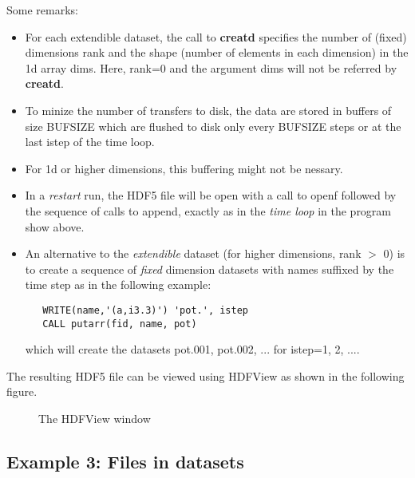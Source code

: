 \documentclass[a4paper]{article}
\begin{document}
Some remarks:
\begin{itemize}
\item  For each extendible dataset, the call to {\bfseries creatd} specifies the number
of (fixed) dimensions {\ttfamily rank} and the shape (number of elements in each
dimension) in the 1d array {\ttfamily dims}. Here, {\ttfamily rank=0} and the
argument {\ttfamily dims} will not be referred by {\bfseries creatd}.
\item  To minize the number of transfers to disk, the data are stored in
buffers of size BUFSIZE which are flushed to disk only every BUFSIZE steps or at the
last istep of the time loop.
\item  For 1d or higher dimensions, this buffering might not be nessary.
\item  In a {\itshape restart\/} run, the HDF5 file will be open with a call to
{\ttfamily openf} followed by the sequence of calls to {\ttfamily append}, exactly as
in the {\itshape time loop\/} in the program show above.
\item  An alternative to the {\itshape extendible\/} dataset (for higher
dimensions, {\ttfamily rank {$>$} 0}) is to create a
sequence of {\itshape fixed\/} dimension datasets with names suffixed by the time
step as in the following example:
\begin{tscreen}
\begin{verbatim}
   WRITE(name,'(a,i3.3)') 'pot.', istep
   CALL putarr(fid, name, pot)
\end{verbatim}
\end{tscreen}

which will create the datasets {\ttfamily pot.001, pot.002, ...} for
{\ttfamily istep=1, 2, ...}.
\end{itemize}


The resulting HDF5 file can be viewed using HDFView as shown in the following
figure.

\begin{figure}[here]
\centerline{}
\caption{ The HDFView window}
\end{figure}





\subsection{Example 3: Files in datasets}
\end{document}
